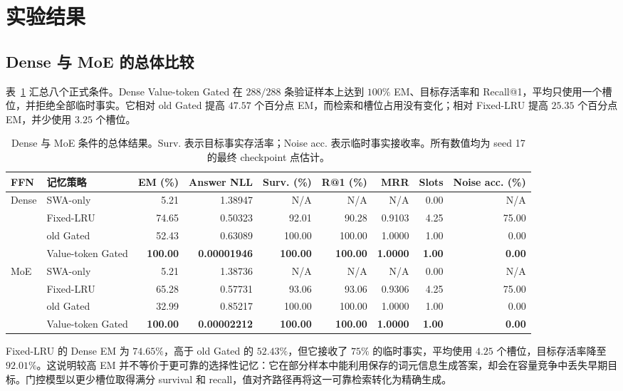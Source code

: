 \documentclass[letterpaper]{article}
\begin{document}
\section{实验结果}

\subsection{Dense 与 MoE 的总体比较}

表~\ref{tab:main} 汇总八个正式条件。Dense Value-token Gated 在 $288/288$ 条验证样本上达到 $100\%$ EM、目标存活率和 Recall@1，平均只使用一个槽位，并拒绝全部临时事实。它相对 old Gated 提高 $47.57$ 个百分点 EM，而检索和槽位占用没有变化；相对 Fixed-LRU 提高 $25.35$ 个百分点 EM，并少使用 $3.25$ 个槽位。

\begin{table}[t]
\centering
\caption{Dense 与 MoE 条件的总体结果。Surv. 表示目标事实存活率；Noise acc. 表示临时事实接收率。所有数值均为 seed 17 的最终 checkpoint 点估计。}
\label{tab:main}
\begin{tabular}{llrrrrrrr}
\toprule
FFN & 记忆策略 & EM (\%) & Answer NLL & Surv. (\%) & R@1 (\%) & MRR & Slots & Noise acc. (\%)\\
\midrule
\multirow{4}{*}{Dense}
& SWA-only & 5.21 & 1.38947 & N/A & N/A & N/A & 0.00 & N/A\\
& Fixed-LRU & 74.65 & 0.50323 & 92.01 & 90.28 & 0.9103 & 4.25 & 75.00\\
& old Gated & 52.43 & 0.63089 & 100.00 & 100.00 & 1.0000 & 1.00 & 0.00\\
& Value-token Gated & \textbf{100.00} & \textbf{0.00001946} & \textbf{100.00} & \textbf{100.00} & \textbf{1.0000} & \textbf{1.00} & \textbf{0.00}\\
\midrule
\multirow{4}{*}{MoE}
& SWA-only & 5.21 & 1.38736 & N/A & N/A & N/A & 0.00 & N/A\\
& Fixed-LRU & 65.28 & 0.57731 & 93.06 & 93.06 & 0.9306 & 4.25 & 75.00\\
& old Gated & 32.99 & 0.85217 & 100.00 & 100.00 & 1.0000 & 1.00 & 0.00\\
& Value-token Gated & \textbf{100.00} & \textbf{0.00002212} & \textbf{100.00} & \textbf{100.00} & \textbf{1.0000} & \textbf{1.00} & \textbf{0.00}\\
\bottomrule
\end{tabular}
\end{table}

Fixed-LRU 的 Dense EM 为 $74.65\%$，高于 old Gated 的 $52.43\%$，但它接收了 $75\%$ 的临时事实，平均使用 $4.25$ 个槽位，目标存活率降至 $92.01\%$。这说明较高 EM 并不等价于更可靠的选择性记忆：它在部分样本中能利用保存的词元信息生成答案，却会在容量竞争中丢失早期目标。门控模型以更少槽位取得满分 survival 和 recall，值对齐路径再将这一可靠检索转化为精确生成。
\end{document}
